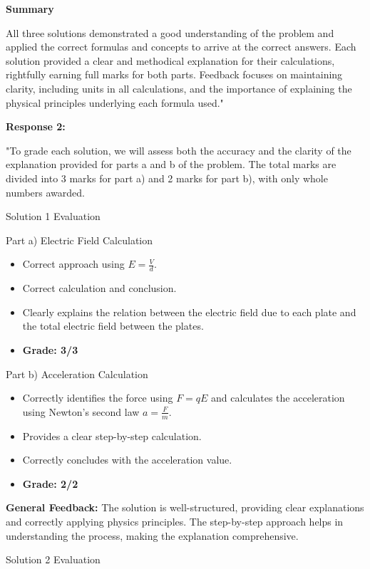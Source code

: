 \documentclass[a4paper,11pt]{article}
\begin{document}
\textbf{Summary}

All three solutions demonstrated a good understanding of the problem and applied the correct formulas and concepts to arrive at the correct answers. Each solution provided a clear and methodical explanation for their calculations, rightfully earning full marks for both parts. Feedback focuses on maintaining clarity, including units in all calculations, and the importance of explaining the physical principles underlying each formula used."

\textbf{Response 2:}

"To grade each solution, we will assess both the accuracy and the clarity of the explanation provided for parts a and b of the problem. The total marks are divided into 3 marks for part a) and 2 marks for part b), with only whole numbers awarded.

Solution 1 Evaluation

Part a) Electric Field Calculation

\begin{itemize}
    \item Correct approach using \(E = \frac{V}{d}\).
    \item Correct calculation and conclusion.
    \item Clearly explains the relation between the electric field due to each plate and the total electric field between the plates.
    \item \textbf{Grade: 3/3}
\end{itemize}

Part b) Acceleration Calculation

\begin{itemize}
    \item Correctly identifies the force using \(F = qE\) and calculates the acceleration using Newton's second law \(a = \frac{F}{m}\).
    \item Provides a clear step-by-step calculation.
    \item Correctly concludes with the acceleration value.
    \item \textbf{Grade: 2/2}
\end{itemize}

\textbf{General Feedback:} The solution is well-structured, providing clear explanations and correctly applying physics principles. The step-by-step approach helps in understanding the process, making the explanation comprehensive.

Solution 2 Evaluation
\end{document}
